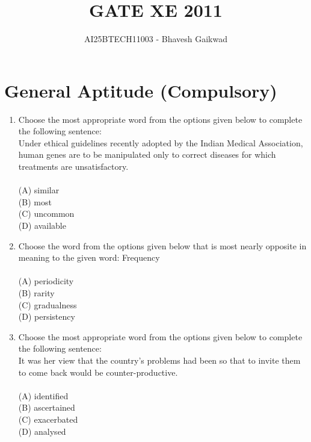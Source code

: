 \documentclass[journal,12pt,onecolumn]{IEEEtran}
\begin{document}
\title{GATE XE 2011}
\author{AI25BTECH11003 - Bhavesh Gaikwad}
\maketitle

\section*{General Aptitude (Compulsory)}
\vspace{1cm}
\begin{enumerate}[label=\textbf{Q\arabic*.},itemsep=2em]

\item Choose the most appropriate word from the options given below to complete the following sentence: \\
Under ethical guidelines recently adopted by the Indian Medical Association, human genes are to be manipulated only to correct diseases for which treatments are unsatisfactory.\\
\vspace{0.2cm}
\hfill{} \\
(A) similar \\
(B) most \\
(C) uncommon \\
(D) available

\item Choose the word from the options given below that is most nearly opposite in meaning to the given word: Frequency\\
\vspace{0.2cm}
\hfill{} \\
(A) periodicity \\
(B) rarity \\
(C) gradualness \\
(D) persistency

\item Choose the most appropriate word from the options given below to complete the following sentence: \\
It was her view that the country's problems had been so that to invite them to come back would be counter-productive. \\
\vspace{0.2cm}
\hfill{} \\
(A) identified \\
(B) ascertained \\
(C) exacerbated \\
(D) analysed


\end{enumerate}
\end{document}
